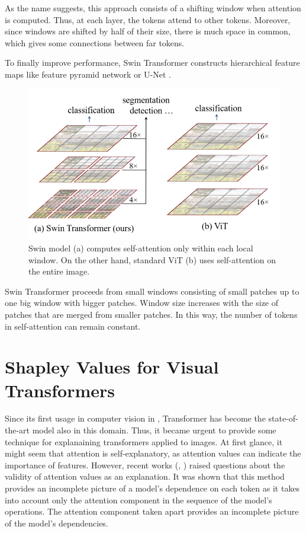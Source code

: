 \documentclass[en]{pracamgr}
\begin{document}
As the name suggests, this approach consists of a shifting window when attention is computed. Thus, at each layer, the tokens attend to other tokens. Moreover, since windows are shifted by half of their size, there is much space in common, which gives some connections between far tokens.

To finally improve performance, Swin Transformer constructs hierarchical feature maps like feature pyramid network \cite{DBLP:conf/cvpr/LinDGHHB17} or U-Net \cite{DBLP:conf/miccai/RonnebergerFB15}.

\begin{figure}[H]
\centering
\includegraphics[scale=0.3]{./images/Swin_window.png}
\caption{Swin model (a) computes self-attention only within each local window. On the other hand, standard ViT (b) uses self-attention on the entire image.}
\end{figure}

Swin Transformer proceeds from small windows consisting of small patches up to one big window with bigger patches. Window size increases with the size of patches that are merged from smaller patches. In this way, the number of tokens in self-attention can remain constant.







\chapter{Shapley Values for Visual Transformers}\label{r:visual_shap}
Since its first usage in computer vision in
\cite{DBLP:conf/iclr/DosovitskiyB0WZ21}, Transformer has become the state-of-the-art model also in this domain. Thus, it became urgent to provide some technique for explanaining transformers applied to images. At first glance, it might seem that attention is self-explanatory, as attention values can indicate the importance of features. However, recent works (\cite{DBLP:conf/acl/SerranoS19},
\cite{DBLP:conf/cvpr/CheferGW21}) raised questions about the validity of attention values as an explanation. It was shown that this method provides an incomplete picture of a model's dependence on each token as it takes into account only the attention component in the sequence of the model's operations. The attention component taken apart provides an incomplete picture of the model's dependencies.
\end{document}
